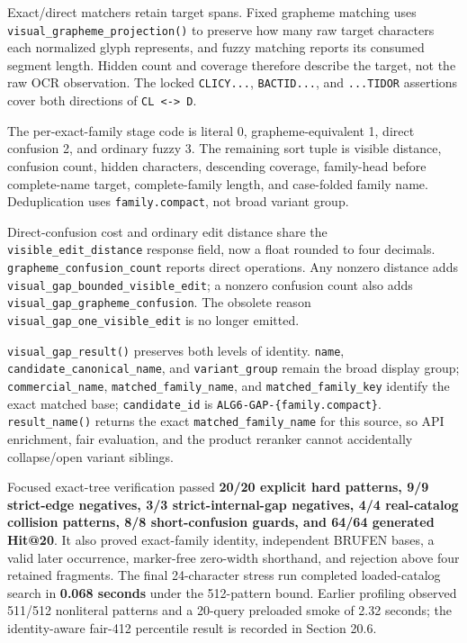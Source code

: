Exact/direct matchers retain target spans. Fixed grapheme matching uses
\texttt{visual\_\allowbreak{}grapheme\_\allowbreak{}projection()} to preserve how many raw target characters each
normalized glyph represents, and fuzzy matching reports its consumed segment
length. Hidden count and coverage therefore describe the target, not the raw
OCR observation. The locked \texttt{CLICY...}, \texttt{BACTID...}, and \texttt{...TIDOR} assertions
cover both directions of \texttt{CL\ \textless{}-\textgreater{}\ D}.

The per-exact-family stage code is literal 0, grapheme-equivalent 1, direct confusion 2, and ordinary fuzzy 3. The remaining sort tuple is visible distance, confusion count, hidden characters, descending coverage, family-head before complete-name target, complete-family length, and case-folded family name. Deduplication uses \texttt{family.compact}, not broad variant group.

Direct-confusion cost and ordinary edit distance share the \texttt{visible\_\allowbreak{}edit\_\allowbreak{}distance} response field, now a float rounded to four decimals. \texttt{grapheme\_\allowbreak{}confusion\_\allowbreak{}count} reports direct operations. Any nonzero distance adds \texttt{visual\_\allowbreak{}gap\_\allowbreak{}bounded\_\allowbreak{}visible\_\allowbreak{}edit}; a nonzero confusion count also adds \texttt{visual\_\allowbreak{}gap\_\allowbreak{}grapheme\_\allowbreak{}confusion}. The obsolete reason \texttt{visual\_\allowbreak{}gap\_\allowbreak{}one\_\allowbreak{}visible\_\allowbreak{}edit} is no longer emitted.

\texttt{visual\_\allowbreak{}gap\_\allowbreak{}result()} preserves both levels of identity. \texttt{name}, \texttt{candidate\_\allowbreak{}canonical\_\allowbreak{}name}, and \texttt{variant\_\allowbreak{}group} remain the broad display group; \texttt{commercial\_\allowbreak{}name}, \texttt{matched\_\allowbreak{}family\_\allowbreak{}name}, and \texttt{matched\_\allowbreak{}family\_\allowbreak{}key} identify the exact matched base; \texttt{candidate\_\allowbreak{}id} is \texttt{ALG6-GAP-\{family.compact\}}. \texttt{result\_\allowbreak{}name()} returns the exact \texttt{matched\_\allowbreak{}family\_\allowbreak{}name} for this source, so API enrichment, fair evaluation, and the product reranker cannot accidentally collapse/open variant siblings.

Focused exact-tree verification passed \textbf{20/20 explicit hard patterns, 9/9 strict-edge negatives, 3/3 strict-internal-gap negatives, 4/4 real-catalog collision patterns, 8/8 short-confusion guards, and 64/64 generated Hit@20}. It also proved exact-family identity, independent BRUFEN bases, a valid later occurrence, marker-free zero-width shorthand, and rejection above four retained fragments. The final 24-character stress run completed loaded-catalog search in \textbf{0.068 seconds} under the 512-pattern bound. Earlier profiling observed 511/512 nonliteral patterns and a 20-query preloaded smoke of 2.32 seconds; the identity-aware fair-412 percentile result is recorded in Section 20.6.

